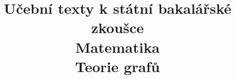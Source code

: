 \clearpage

\clearpage

\title{\LARGE Učební texty k státní bakalářské zkoušce \\ Matematika \\ Teorie grafů}



\maketitle

\newpage
\setcounter{section}{16}



